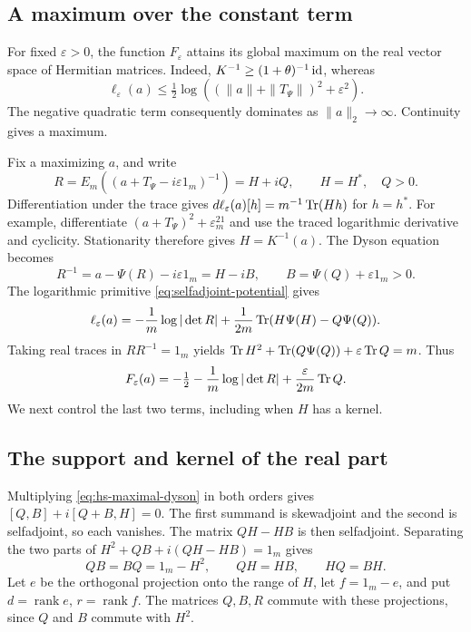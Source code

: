 \subsection{A maximum over the constant term}
For fixed $\varepsilon>0$, the function $F_\varepsilon$ attains its global maximum on the real vector space of Hermitian matrices.
Indeed, $K^{-1}\ge(1+\theta)^{-1}\operatorname{id}$, whereas
\[
 \ell_\varepsilon(a)\le\tfrac12
       \log((\|a\|+\|T_\Psi\|)^2+\varepsilon^2).
\]
The negative quadratic term consequently dominates as $\|a\|_2\to\infty$.
Continuity gives a maximum.

Fix a maximizing $a$, and write
\[
 R=E_m((a+T_\Psi-i\varepsilon1_m)^{-1})=H+iQ,
 \qquad H=H^*,\quad Q>0.
\]
Differentiation under the trace gives $d\ell_\varepsilon(a)[h]=m^{-1}\operatorname{Tr}(Hh)$ for $h=h^*$.
For example, differentiate $(a+T_\Psi)^2+\varepsilon^21_m$ and use the traced logarithmic derivative and cyclicity.
Stationarity therefore gives $H=K^{-1}(a)$.
The Dyson equation becomes
\begin{equation}\label{eq:hs-maximal-dyson}
 R^{-1}=a-\Psi(R)-i\varepsilon1_m=H-iB,
 \qquad B=\Psi(Q)+\varepsilon1_m>0.
\end{equation}
The logarithmic primitive \eqref{eq:selfadjoint-potential} gives
\[
 \ell_\varepsilon(a)=-\frac1m\log|\det R|
       +\frac1{2m}\operatorname{Tr}(H\Psi(H)-Q\Psi(Q)).
\]
Taking real traces in $RR^{-1}=1_m$ yields $\operatorname{Tr} H^2+\operatorname{Tr}(Q\Psi(Q))+\varepsilon\operatorname{Tr} Q=m$.
Thus
\begin{equation}\label{eq:hs-maximal-value}
 F_\varepsilon(a)=-\tfrac12-\frac1m\log|\det R|
                         +\frac{\varepsilon}{2m}\operatorname{Tr} Q.
\end{equation}
We next control the last two terms, including when $H$ has a kernel.

\subsection{The support and kernel of the real part}
Multiplying \eqref{eq:hs-maximal-dyson} in both orders gives $[Q,B]+i[Q+B,H]=0$.
The first summand is skewadjoint and the second is selfadjoint, so each vanishes.
The matrix $QH-HB$ is then selfadjoint.
Separating the two parts of $H^2+QB+i(QH-HB)=1_m$ gives
\begin{equation}\label{eq:hs-support-identities}
 QB=BQ=1_m-H^2,\qquad QH=HB,\qquad HQ=BH.
\end{equation}
Let $e$ be the orthogonal projection onto the range of $H$, let $f=1_m-e$, and put $d=\operatorname{rank}e$, $r=\operatorname{rank}f$.
The matrices $Q,B,R$ commute with these projections, since $Q$ and $B$ commute with $H^2$.

